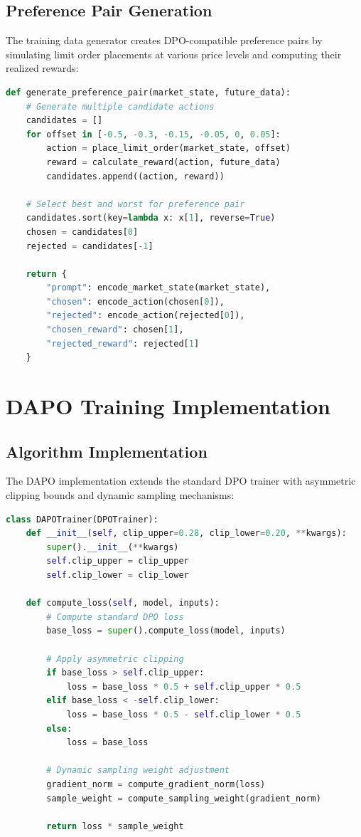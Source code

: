 \documentclass{report}
\begin{document}
\subsection{Preference Pair Generation}

The training data generator creates DPO-compatible preference pairs by simulating limit order placements at various price levels and computing their realized rewards:

\begin{lstlisting}[language=Python, caption=Preference pair generation]
def generate_preference_pair(market_state, future_data):
    # Generate multiple candidate actions
    candidates = []
    for offset in [-0.5, -0.3, -0.15, -0.05, 0, 0.05]:
        action = place_limit_order(market_state, offset)
        reward = calculate_reward(action, future_data)
        candidates.append((action, reward))
    
    # Select best and worst for preference pair
    candidates.sort(key=lambda x: x[1], reverse=True)
    chosen = candidates[0]
    rejected = candidates[-1]
    
    return {
        "prompt": encode_market_state(market_state),
        "chosen": encode_action(chosen[0]),
        "rejected": encode_action(rejected[0]),
        "chosen_reward": chosen[1],
        "rejected_reward": rejected[1]
    }
\end{lstlisting}

\section{DAPO Training Implementation}

\subsection{Algorithm Implementation}

The DAPO implementation extends the standard DPO trainer with asymmetric clipping bounds and dynamic sampling mechanisms:

\begin{lstlisting}[language=Python, caption=DAPO loss computation]
class DAPOTrainer(DPOTrainer):
    def __init__(self, clip_upper=0.28, clip_lower=0.20, **kwargs):
        super().__init__(**kwargs)
        self.clip_upper = clip_upper
        self.clip_lower = clip_lower
    
    def compute_loss(self, model, inputs):
        # Compute standard DPO loss
        base_loss = super().compute_loss(model, inputs)
        
        # Apply asymmetric clipping
        if base_loss > self.clip_upper:
            loss = base_loss * 0.5 + self.clip_upper * 0.5
        elif base_loss < -self.clip_lower:
            loss = base_loss * 0.5 - self.clip_lower * 0.5
        else:
            loss = base_loss
            
        # Dynamic sampling weight adjustment
        gradient_norm = compute_gradient_norm(loss)
        sample_weight = compute_sampling_weight(gradient_norm)
        
        return loss * sample_weight
\end{lstlisting}
\end{document}
